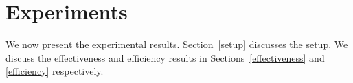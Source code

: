 \section{Experiments}
\label{experiment}

We now present the experimental results. Section~\ref{setup} discusses the setup. We discuss the effectiveness and efficiency results in Sections~\ref{effectiveness} and \ref{efficiency} respectively.





 